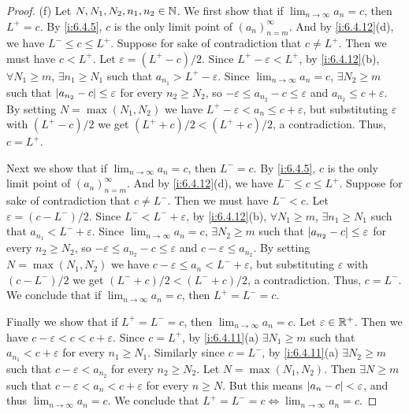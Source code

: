\begin{proof}{(f)}
  Let \(N, N_1, N_2, n_1, n_2 \in \mathbb{N}\).
  We first show that if \(\lim_{n \to \infty} a_n = c\), then \(L^+ = c\).
  By \cref{i:6.4.5}, \(c\) is the only limit point of \((a_n)_{n = m}^\infty\).
  And by \cref{i:6.4.12}(d), we have \(L^- \leq c \leq L^+\).
  Suppose for sake of contradiction that \(c \neq L^+\).
  Then we must have \(c < L^+\).
  Let \(\varepsilon = (L^+ - c) / 2\).
  Since \(L^+ - \varepsilon < L^+\), by \cref{i:6.4.12}(b), \(\forall N_1 \geq m\), \(\exists n_1 \geq N_1\) such that \(a_{n_1} > L^+ - \varepsilon\).
  Since \(\lim_{n \to \infty} a_n = c\), \(\exists N_2 \geq m\) such that \(\left\lvert a_{n_2} - c\right\rvert \leq \varepsilon\) for every \(n_2 \geq N_2\), so \(-\varepsilon \leq a_{n_2} - c \leq \varepsilon\) and \(a_{n_2} \leq c + \varepsilon\).
  By setting \(N = \max(N_1, N_2)\) we have \(L^+ - \varepsilon < a_n \leq c + \varepsilon\), but substituting \(\varepsilon\) with \((L^+ - c) / 2\) we get \((L^+ + c) / 2 < (L^+ + c) / 2\), a contradiction.
  Thus, \(c = L^+\).

  Next we show that if \(\lim_{n \to \infty} a_n = c\), then \(L^- = c\).
  By \cref{i:6.4.5}, \(c\) is the only limit point of \((a_n)_{n = m}^\infty\).
  And by \cref{i:6.4.12}(d), we have \(L^- \leq c \leq L^+\).
  Suppose for sake of contradiction that \(c \neq L^-\).
  Then we must have \(L^- < c\).
  Let \(\varepsilon = (c - L^-) / 2\).
  Since \(L^- < L^- + \varepsilon\), by \cref{i:6.4.12}(b), \(\forall N_1 \geq m\), \(\exists n_1 \geq N_1\) such that \(a_{n_1} < L^- + \varepsilon\).
  Since \(\lim_{n \to \infty} a_n = c\), \(\exists N_2 \geq m\) such that \(\left\lvert a_{n_2} - c\right\rvert \leq \varepsilon\) for every \(n_2 \geq N_2\), so \(-\varepsilon \leq a_{n_2} - c \leq \varepsilon\) and \(c - \varepsilon \leq a_{n_2}\).
  By setting \(N = \max(N_1, N_2)\) we have \(c - \varepsilon \leq a_n < L^- + \varepsilon\), but substituting \(\varepsilon\) with \((c - L^-) / 2\) we get \((L^- + c) / 2 < (L^- + c) / 2\), a contradiction.
  Thus, \(c = L^-\).
  We conclude that if \(\lim_{n \to \infty} a_n = c\), then \(L^+ = L^- = c\).

  Finally we show that if \(L^+ = L^- = c\), then \(\lim_{n \to \infty} a_n = c\).
  Let \(\varepsilon \in \mathbb{R}^+\).
  Then we have \(c - \varepsilon < c < c + \varepsilon\).
  Since \(c = L^+\), by \cref{i:6.4.11}(a) \(\exists N_1 \geq m\) such that \(a_{n_1} < c + \varepsilon\) for every \(n_1 \geq N_1\).
  Similarly since \(c = L^-\), by \cref{i:6.4.11}(a) \(\exists N_2 \geq m\) such that \(c - \varepsilon < a_{n_2}\) for every \(n_2 \geq N_2\).
  Let \(N = \max(N_1, N_2)\).
  Then \(\exists N \geq m\) such that \(c - \varepsilon < a_n < c + \varepsilon\) for every \(n \geq N\).
  But this means \(\left\lvert a_n - c\right\rvert < \varepsilon\), and thus \(\lim_{n \to \infty} a_n = c\).
  We conclude that \(L^+ = L^- = c \iff \lim_{n \to \infty} a_n = c\).
\end{proof}

